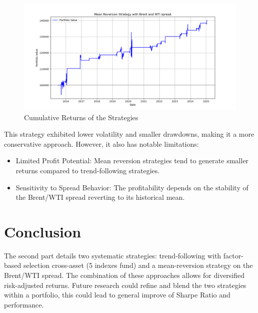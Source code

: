 \documentclass[11pt, oneside, a4paper, titlepage]{report}
\begin{document}
\begin{figure}
    \centering
    \includegraphics[width=1.2\textwidth]{wti_brent_spread.png}
    \caption{Cumulative Returns of the Strategies}
\end{figure}

This strategy exhibited lower volatility and smaller drawdowns, making it a more conservative approach. However, it also has notable limitations:

\begin{itemize}
    \item Limited Profit Potential: Mean reversion strategies tend to generate smaller returns compared to trend-following strategies.
    \item Sensitivity to Spread Behavior: The profitability depends on the stability of the Brent/WTI spread reverting to its historical mean.
\end{itemize}


\chapter{Conclusion}
The second part details two systematic strategies: trend-following with factor-based selection cross-asset (5 indexes fund) and a mean-reversion strategy on the Brent/WTI spread. The combination of these approaches allows for diversified risk-adjusted returns. Future research could refine and blend the two strategies within a portfolio, this could lead to general improve of Sharpe Ratio and performance.
\end{document}
